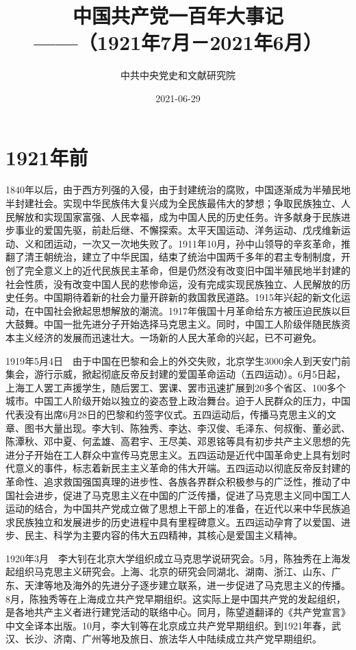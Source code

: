 \documentclass[10pt,a4paper,twocolumn]{book}
\begin{document}
\title{中国共产党一百年大事记\\
\large{——（1921年7月－2021年6月）}}
\author{中共中央党史和文献研究院}
\date{2021-06-29}

\maketitle
\cleardoublepage

\section{1921年前}

1840年以后，由于西方列强的入侵，由于封建统治的腐败，中国逐渐成为半殖民地半封建社会。实现中华民族伟大复兴成为全民族最伟大的梦想；争取民族独立、人民解放和实现国家富强、人民幸福，成为中国人民的历史任务。许多献身于民族进步事业的爱国先驱，前赴后继、不懈探索。太平天国运动、洋务运动、戊戌维新运动、义和团运动，一次又一次地失败了。1911年10月，孙中山领导的辛亥革命，推翻了清王朝统治，建立了中华民国，结束了统治中国两千多年的君主专制制度，开创了完全意义上的近代民族民主革命，但是仍然没有改变旧中国半殖民地半封建的社会性质，没有改变中国人民的悲惨命运，没有完成实现民族独立、人民解放的历史任务。中国期待着新的社会力量开辟新的救国救民道路。1915年兴起的新文化运动，在中国社会掀起思想解放的潮流。1917年俄国十月革命给东方被压迫民族以巨大鼓舞。中国一批先进分子开始选择马克思主义。同时，中国工人阶级伴随民族资本主义经济的发展而迅速壮大。一场新的人民大革命的兴起，已不可避免。

1919年5月4日　由于中国在巴黎和会上的外交失败，北京学生3000余人到天安门前集会，游行示威，掀起彻底反帝反封建的爱国革命运动（五四运动）。6月5日起，上海工人罢工声援学生，随后罢工、罢课、罢市迅速扩展到20多个省区、100多个城市。中国工人阶级开始以独立的姿态登上政治舞台。迫于人民群众的压力，中国代表没有出席6月28日的巴黎和约签字仪式。五四运动后，传播马克思主义的文章、图书大量出现。李大钊、陈独秀、李达、李汉俊、毛泽东、何叔衡、董必武、陈潭秋、邓中夏、何孟雄、高君宇、王尽美、邓恩铭等具有初步共产主义思想的先进分子开始在工人群众中宣传马克思主义。五四运动是近代中国革命史上具有划时代意义的事件，标志着新民主主义革命的伟大开端。五四运动以彻底反帝反封建的革命性、追求救国强国真理的进步性、各族各界群众积极参与的广泛性，推动了中国社会进步，促进了马克思主义在中国的广泛传播，促进了马克思主义同中国工人运动的结合，为中国共产党成立做了思想上干部上的准备，在近代以来中华民族追求民族独立和发展进步的历史进程中具有里程碑意义。五四运动孕育了以爱国、进步、民主、科学为主要内容的伟大五四精神，其核心是爱国主义精神。

1920年3月　李大钊在北京大学组织成立马克思学说研究会。5月，陈独秀在上海发起组织马克思主义研究会。上海、北京的研究会同湖北、湖南、浙江、山东、广东、天津等地及海外的先进分子逐步建立联系，进一步促进了马克思主义的传播。8月，陈独秀等在上海成立共产党早期组织。这实际上是中国共产党的发起组织，是各地共产主义者进行建党活动的联络中心。同月，陈望道翻译的《共产党宣言》中文全译本出版。10月，李大钊等在北京成立共产党早期组织。到1921年春，武汉、长沙、济南、广州等地及旅日、旅法华人中陆续成立共产党早期组织。
\end{document}
